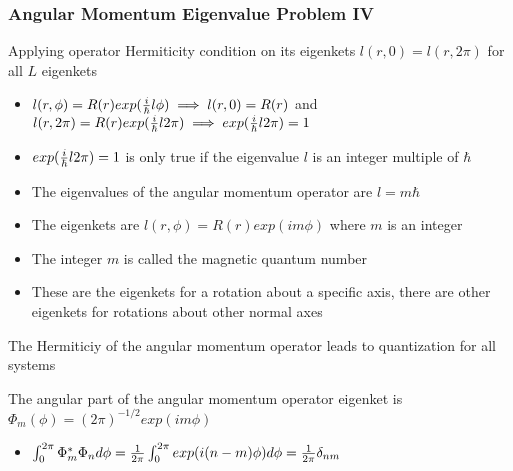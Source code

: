 \documentclass[8pt,t,mathserif,aspectratio=169]{beamer}
\begin{document}
\begin{frame}
  \frametitle{Angular Momentum Eigenvalue Problem IV}
  \vspace{1mm}
  Applying operator Hermiticity condition on its eigenkets $l(r,0) = l(r,2 \pi)$ for all $L$ eigenkets
  \begin{itemize}
    \item $l(r,\phi) = R(r) exp({i \over \hbar} l \phi) \implies l(r,0) = R(r)$ and $l(r,2 \pi) = R(r) exp({i \over \hbar} l 2 \pi) \implies exp({i \over \hbar} l 2 \pi) = 1$
    \item $exp({i \over \hbar} l 2 \pi) = 1$ is only true if the eigenvalue $l$ is an integer multiple of $\hbar$
    \item The eigenvalues of the angular momentum operator are $l = m \hbar$
    \item The eigenkets are $l(r,\phi) = R(r) exp(i m \phi)$ where $m$ is an integer
    \item The integer $m$ is called the magnetic quantum number
    \item These are the eigenkets for a rotation about a specific axis, there are other eigenkets for rotations about other normal axes
  \end{itemize}
  The Hermiticiy of the angular momentum operator leads to quantization for all systems

  The angular part of the angular momentum operator eigenket is $\Phi_m(\phi) = (2 \pi)^{-1/2} exp(i m \phi)$
  \begin{itemize}
    \item $\int_{0}^{2 \pi} \Phi_m^{*} \Phi_n d\phi = {1 \over {2 \pi}} \int_{0}^{2 \pi} exp(i (n - m) \phi) d\phi = {1 \over {2 \pi}} \delta_{nm}$
  \end{itemize}
\end{frame}
\end{document}
